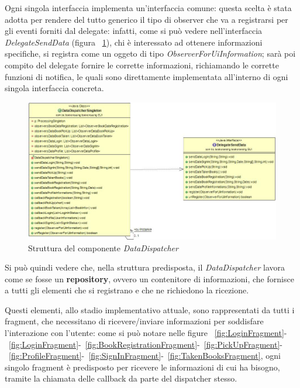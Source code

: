 Ogni singola interfaccia implementa un'interfaccia comune: questa scelta è stata adotta per rendere del tutto generico il tipo di observer che va a registrarsi per gli eventi forniti dal delegate: infatti, come si può vedere nell'interfaccia \textit{DelegateSendData} (figura ~\ref{fig:DataDispatcher}), chi è interessato ad ottenere informazioni specifiche, si registra come un oggeto di tipo \textit{ObserverForUiInformation}; sarà poi compito del delegate fornire le corrette informazioni, richiamando le corrette funzioni di notifica, le quali sono direttamente implementata all'interno di ogni singola interfaccia concreta.

\begin{figure}[h]
	\includegraphics[width=\textwidth]{Immagini/ClassDiagramDispatcherDelegate}
	\caption{Struttura del componente \textit{DataDispatcher}}
	\label{fig:DataDispatcher}
\end{figure}

Si può quindi vedere che, nella struttura predisposta, il \textit{DataDispatcher} lavora come se fosse un \textbf{repository}, ovvero un contenitore di informazioni, che fornisce a tutti gli elementi che si registrano e che ne richiedono la ricezione.

Questi elementi, allo stadio implementativo attuale, sono rappresentati da tutti i fragment, che necessitano di ricevere/inviare informazioni per soddisfare l'interazione con l'utente: come si può notare nelle figure ~\ref{fig:LoginFragment}-~\ref{fig:LoginFragment}-~\ref{fig:BookRegistrationFragment}-~\ref{fig:PickUpFragment}-~\ref{fig:ProfileFragment}-~\ref{fig:SignInFragment}-~\ref{fig:TakenBooksFragment}, ogni singolo fragment è predisposto per ricevere le informazioni di cui ha bisogno, tramite la chiamata delle callback da parte del dispatcher stesso.

